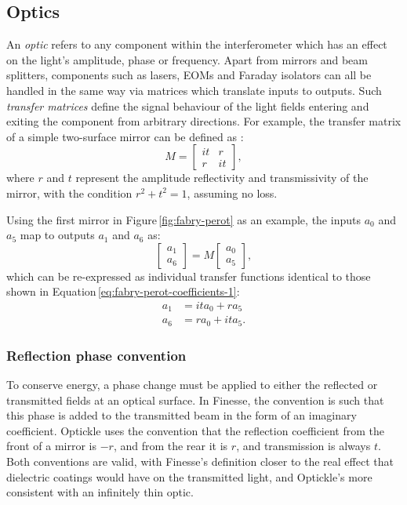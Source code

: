 \subsection{Optics}
An \emph{optic} refers to any component within the interferometer which has an effect on the light's amplitude, phase or frequency. Apart from mirrors and beam splitters, components such as lasers, \glspl{EOM} and Faraday isolators can all be handled in the same way via matrices which translate inputs to outputs. Such \emph{transfer matrices} define the signal behaviour of the light fields entering and exiting the component from arbitrary directions. For example, the transfer matrix of a simple two-surface mirror can be defined as \cite{Freise2010}:
\begin{equation}
  M =
  \begin{bmatrix}
    it & r \\
    r & it
  \end{bmatrix},
\end{equation}
where $r$ and $t$ represent the amplitude reflectivity and transmissivity of the mirror, with the condition $r^2 + t^2 = 1$, assuming no loss.

Using the first mirror in Figure\,\ref{fig:fabry-perot} as an example, the inputs $a_0$ and $a_5$ map to outputs $a_1$ and $a_6$ as:
\begin{equation}
  \begin{bmatrix}
    a_1 \\
    a_6
  \end{bmatrix}
  =
  M
  \begin{bmatrix}
    a_0 \\
    a_5
  \end{bmatrix}
  ,
\end{equation}
which can be re-expressed as individual transfer functions identical to those shown in Equation\,\ref{eq:fabry-perot-coefficients-1}:
\begin{equation}
  \begin{split}
    a_1 &= it a_0 + r a_5 \\
    a_6 &= r a_0 + it a_5.
  \end{split}
\end{equation}

\subsubsection{\label{a:reflection-phase}Reflection phase convention}
To conserve energy, a phase change must be applied to either the reflected or transmitted fields at an optical surface. In Finesse, the convention is such that this phase is added to the transmitted beam in the form of an imaginary coefficient. Optickle uses the convention that the reflection coefficient from the front of a mirror is $-r$, and from the rear it is $r$, and transmission is always $t$. Both conventions are valid, with Finesse's definition closer to the real effect that dielectric coatings would have on the transmitted light, and Optickle's more consistent with an infinitely thin optic.


